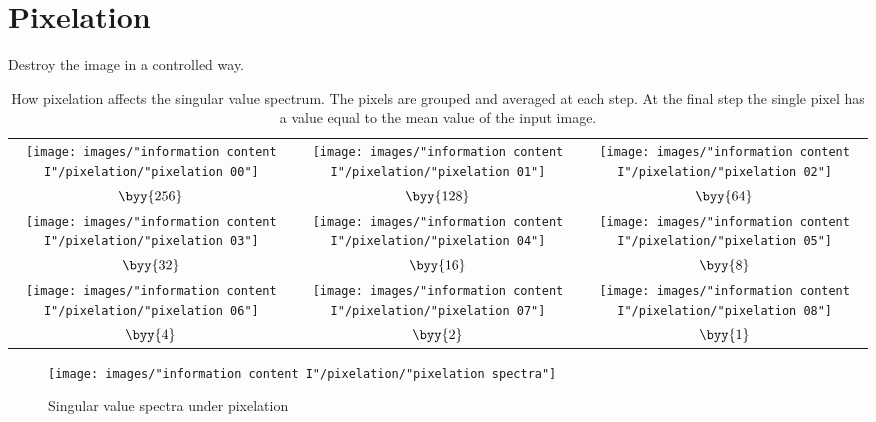 \section{Pixelation}
Destroy the image in a controlled way.

\begin{table}[htdp]
\caption[How pixelation affects the singular value spectrum]{How pixelation affects the singular value spectrum.  The pixels are grouped and averaged at each step. At the final step the single pixel has a value equal to the mean value of the input image.}
\begin{center}
\begin{tabular}{ccc}
%
 \texttt{[image: images/"information content I"/pixelation/"pixelation 00"]} &
 \texttt{[image: images/"information content I"/pixelation/"pixelation 01"]} &
 \texttt{[image: images/"information content I"/pixelation/"pixelation 02"]} \\
%
  $\byy{256}$ &  $\byy{128}$ &  $\byy{64}$  \\[20pt]
%
 \texttt{[image: images/"information content I"/pixelation/"pixelation 03"]} &
 \texttt{[image: images/"information content I"/pixelation/"pixelation 04"]} &
 \texttt{[image: images/"information content I"/pixelation/"pixelation 05"]} \\
%
  $\byy{32}$ &  $\byy{16}$ &  $\byy{8}$  \\[20pt]
%
 \texttt{[image: images/"information content I"/pixelation/"pixelation 06"]} &
 \texttt{[image: images/"information content I"/pixelation/"pixelation 07"]} &
 \texttt{[image: images/"information content I"/pixelation/"pixelation 08"]} \\
%
  $\byy{4}$ &  $\byy{2}$ &  $\byy{1}$
%
\end{tabular}
\end{center}
\label{default}
\end{table}%

\begin{figure}[htbp] %
   \centering
   \texttt{[image: images/"information content I"/pixelation/"pixelation spectra"]} 
   \caption{Singular value spectra under pixelation}
   \label{fig:example}
\end{figure}

\endinput